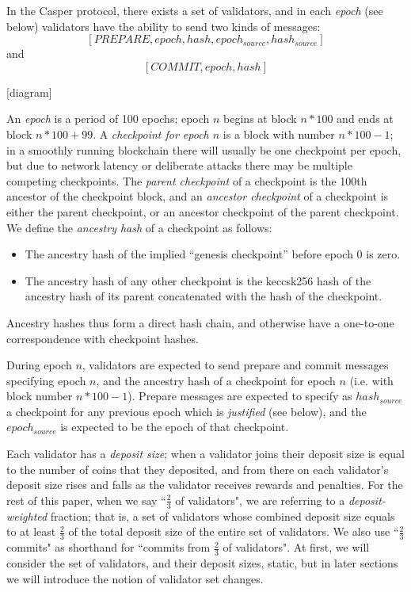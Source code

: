 \documentclass[12pt]{article}
\begin{document}
In the Casper protocol, there exists a set of validators, and in each \textit{epoch} (see below) validators have the ability to send two kinds of messages: $$[PREPARE, epoch, hash, epoch_{source}, hash_{source}]$$ and $$[COMMIT, epoch, hash]$$

[diagram]

An \textit{epoch} is a period of 100 epochs; epoch $n$ begins at block $n * 100$ and ends at block $n * 100 + 99$. A \textit{checkpoint for epoch $n$} is a block with number $n * 100 - 1$; in a smoothly running blockchain there will usually be one checkpoint per epoch, but due to network latency or deliberate attacks there may be multiple competing checkpoints. The \textit{parent checkpoint} of a checkpoint is the 100th ancestor of the checkpoint block, and an \textit{ancestor checkpoint} of a checkpoint is either the parent checkpoint, or an ancestor checkpoint of the parent checkpoint. We define the \textit{ancestry hash} of a checkpoint as follows:

\begin{itemize}
\item The ancestry hash of the implied ``genesis checkpoint'' before epoch 0 is zero.
\item The ancestry hash of any other checkpoint is the keccsk256 hash of the ancestry hash of its parent concatenated with the hash of the checkpoint.
\end{itemize}

Ancestry hashes thus form a direct hash chain, and otherwise have a one-to-one correspondence with checkpoint hashes.

During epoch $n$, validators are expected to send prepare and commit messages specifying epoch $n$, and the ancestry hash of a checkpoint for epoch $n$ (i.e. with block number $n * 100 - 1$). Prepare messages are expected to specify as $hash_{source}$ a checkpoint for any previous epoch which is \textit{justified} (see below), and the $epoch_{source}$ is expected to be the epoch of that checkpoint.

Each validator has a \textit{deposit size}; when a validator joins their deposit size is equal to the number of coins that they deposited, and from there on each validator's deposit size rises and falls as the validator receives rewards and penalties. For the rest of this paper, when we say ``$\frac{2}{3}$ of validators", we are referring to a \textit{deposit-weighted} fraction; that is, a set of validators whose combined deposit size equals to at least $\frac{2}{3}$ of the total deposit size of the entire set of validators. We also use ``$\frac{2}{3}$ commits" as shorthand for ``commits from $\frac{2}{3}$ of validators". At first, we will consider the set of validators, and their deposit sizes, static, but in later sections we will introduce the notion of validator set changes.
\end{document}
